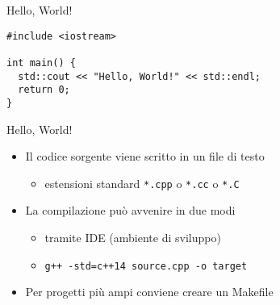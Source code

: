 \begin{frame}[fragile]{Hello, World!}
  \vfill
  \begin{center}\end{center}
  \vfill
  \begin{lstlisting}
#include <iostream>

int main() {
  std::cout << "Hello, World!" << std::endl;
  return 0;
}
  \end{lstlisting}
  \vfill
\end{frame}

\begin{frame}[fragile]{Hello, World!}
  \vfill
  \begin{itemize}
    \item Il codice sorgente viene scritto in un file di testo
    \begin{itemize}
      \item estensioni standard \lstinline$*.cpp$ o \lstinline$*.cc$ o \lstinline$*.C$
    \end{itemize}
    \vfill
    \item La compilazione può avvenire in due modi
    \begin{itemize}
      \item tramite IDE (ambiente di sviluppo)
      \item \lstinline$g++ -std=c++14 source.cpp -o target$
    \end{itemize}
    \vfill
    \item Per progetti più ampi conviene creare un \alert{Makefile}
  \end{itemize}
  \vfill
\end{frame}

